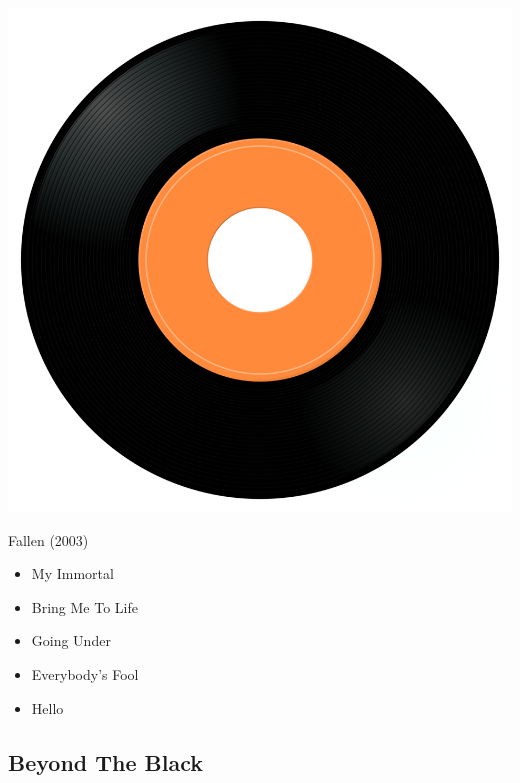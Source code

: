\begin{minipage}[t]{0.25\textwidth}
\captionsetup{type=figure}
\includegraphics[width=\textwidth]{Images/cover.png}
\caption*{Fallen (2003)}
\end{minipage}
\begin{minipage}[t]{0.25\textwidth}\vspace{0pt}
\begin{itemize}[nosep,leftmargin=1em,labelwidth=*,align=left]
	\setlength{\itemsep}{0pt}
	\item My Immortal 
	\item Bring Me To Life
	\item Going Under
	\item Everybody's Fool
	\item Hello
\end{itemize}
\end{minipage}

\subsection{Beyond The Black}


